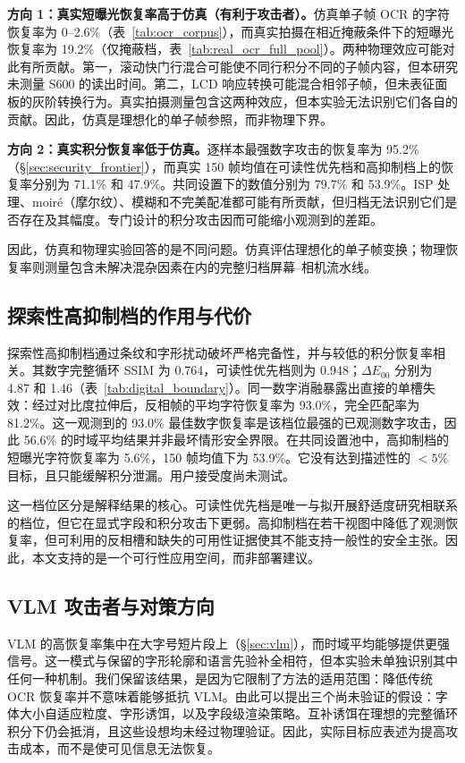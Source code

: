 \textbf{方向 1：真实短曝光恢复率高于仿真（有利于攻击者）。}仿真单子帧 OCR 的字符恢复率为 0--2.6\%（表~\ref{tab:ocr_corpus}），而真实拍摄在相近掩蔽条件下的短曝光恢复率为 19.2\%（仅掩蔽档，表~\ref{tab:real_ocr_full_pool}）。两种物理效应可能对此有所贡献。第一，滚动快门行混合可能使不同行积分不同的子帧内容，但本研究未测量 S600 的读出时间。第二，LCD 响应转换可能混合相邻子帧，但未表征面板的灰阶转换行为。真实拍摄测量包含这两种效应，但本实验无法识别它们各自的贡献。因此，仿真是理想化的单子帧参照，而非物理下界。

\textbf{方向 2：真实积分恢复率低于仿真。}逐样本最强数字攻击的恢复率为 95.2\%（\S\ref{sec:security_frontier}），而真实 150 帧均值在可读性优先档和高抑制档上的恢复率分别为 71.1\% 和 47.9\%。共同设置下的数值分别为 79.7\% 和 53.9\%。ISP 处理、moir\'{e}（摩尔纹）、模糊和不完美配准都可能有所贡献，但归档无法识别它们是否存在及其幅度。专门设计的积分攻击因而可能缩小观测到的差距。

因此，仿真和物理实验回答的是不同问题。仿真评估理想化的单子帧变换；物理恢复率则测量包含未解决混杂因素在内的完整归档屏幕--相机流水线。

\subsection{探索性高抑制档的作用与代价}

探索性高抑制档通过条纹和字形扰动破坏严格完备性，并与较低的积分恢复率相关。其数字完整循环 SSIM 为 0.764，可读性优先档则为 0.948；$\Delta E_{00}$ 分别为 4.87 和 1.46（表~\ref{tab:digital_boundary}）。同一数字消融暴露出直接的单槽失效：经过对比度拉伸后，反相帧的平均字符恢复率为 93.0\%，完全匹配率为 81.2\%。这一观测到的 93.0\% 最佳数字恢复率是该档位最强的已观测数字攻击，因此 56.6\% 的时域平均结果并非最坏情形安全界限。在共同设置池中，高抑制档的短曝光字符恢复率为 5.6\%，150 帧均值下为 53.9\%。它没有达到描述性的 $<5\%$ 目标，且只能缓解积分泄漏。用户接受度尚未测试。

这一档位区分是解释结果的核心。可读性优先档是唯一与拟开展舒适度研究相联系的档位，但它在显式字段和积分攻击下更弱。高抑制档在若干视图中降低了观测恢复率，但可利用的反相槽和缺失的可用性证据使其不能支持一般性的安全主张。因此，本文支持的是一个可行性应用空间，而非部署建议。

\subsection{VLM 攻击者与对策方向}
\label{sec:vlm_defense}

VLM 的高恢复率集中在大字号短片段上（\S\ref{sec:vlm}），而时域平均能够提供更强信号。这一模式与保留的字形轮廓和语言先验补全相符，但本实验未单独识别其中任何一种机制。我们保留该结果，是因为它限制了方法的适用范围：降低传统 OCR 恢复率并不意味着能够抵抗 VLM。由此可以提出三个尚未验证的假设：字体大小自适应粒度、字形诱饵，以及字段级渲染策略。互补诱饵在理想的完整循环积分下仍会抵消，且这些设想均未经过物理验证。因此，实际目标应表述为提高攻击成本，而不是使可见信息无法恢复。

